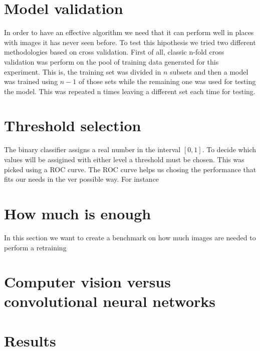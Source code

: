 \section{Model validation}

In order to have an effective algorithm we need that it can perform well in places with images it has never seen before. To test this hipothesis we tried two different methodologies based on cross validation. First of all, classic n-fold cross validation was perform on the pool of training data generated for this experiment. This is, the training set was divided in $n$ subsets and then a model was trained using $n-1$ of those sets while the remaining one was used for testing the model. This was repeated n times leaving a different set each time for testing.

\section{Threshold selection}

The binary classifier assigns a real number in the interval $[0,1]$. To decide which values will be assigined with either level a threshold must be chosen. This was picked using a ROC curve. The ROC curve helps us chosing the performance that fits our needs in the ver possible way. For instance

\section{How much is enough}

In this section we want to create a benchmark on how much images are needed to perform a retraining 

\section{Computer vision versus convolutional neural networks}

\section{Results}

